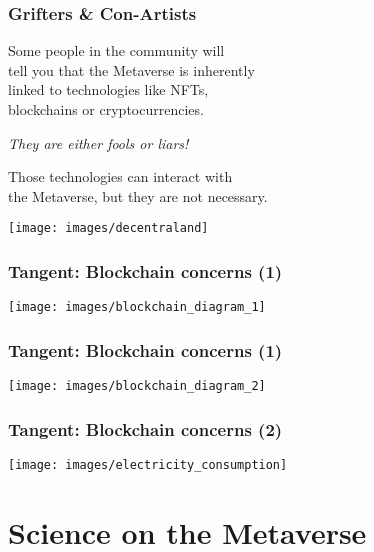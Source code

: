 \documentclass[aspectratio=169,x11names]{beamer}
\begin{document}
\begin{frame}
\frametitle{Grifters \& Con-Artists}
\begin{minipage}{0.55\textwidth}
Some people in the community will\\ tell you that the Metaverse is inherently\\ linked to
technologies like NFTs,\\ blockchains or cryptocurrencies.
\bigskip

\emph{They are either fools or liars!}
\bigskip

Those technologies can interact with\\ the Metaverse, but they are not necessary. 
\end{minipage}%
\hfill
\begin{minipage}{0.45\textwidth}
\begin{center}
\texttt{[image: images/decentraland]} 
\end{center}
\end{minipage}
\end{frame}

\begin{frame}
\frametitle{Tangent: Blockchain concerns (1)}
\begin{center}
\texttt{[image: images/blockchain\_diagram\_1]} 
\end{center}
\end{frame}

\begin{frame}
\frametitle{Tangent: Blockchain concerns (1)}
\vfill
\begin{center}
\texttt{[image: images/blockchain\_diagram\_2]} 
\end{center}
\end{frame}

\begin{frame}
\frametitle{Tangent: Blockchain concerns (2)}
\begin{center}
\texttt{[image: images/electricity\_consumption]} 
\end{center}
\end{frame}

\section{Science on the Metaverse}
\end{document}
